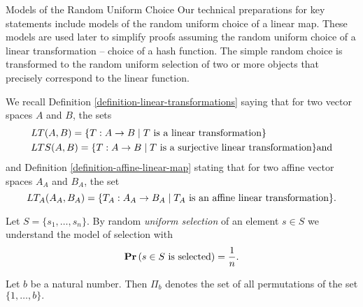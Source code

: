 \begin{section}{Models of the Random Uniform Choice}
Our technical preparations for key statements include models of the random uniform choice of a linear map. These models are used later to simplify proofs assuming the random uniform choice of a linear transformation -- choice of a hash function. The simple random choice is transformed to the random uniform selection of two or more objects that precisely correspond to the linear function.

We recall Definition \ref{definition-linear-transformations} saying that for two vector spaces $A$ and $B$, the sets 
\[
\begin{split}
& LT(A, B) = \{ T: A \rightarrow B \mid T \text{ is a linear transformation} \} \\
& LTS(A, B) = \{ T: A \rightarrow B \mid T \text{ is a surjective linear transformation} \} \text{and}
\end{split}
\]
and Definition \ref{definition-affine-linear-map} stating that for two affine vector spaces $A_A$ and $B_A$, the set
\[
LT_A(A_A, B_A) = \{ T_A: A_A \rightarrow B_A \mid T_A \text{ is an affine linear transformation} \} \text{.}
\]

\begin{definition}
Let $S = \{ s_1, \dots, s_n \}$. By random \emph{uniform selection} of an element $s \in S$ we understand the model of selection with
\[
	\mathbf{Pr}\left(s \in S \text{ is selected}\right) = \frac{1}{n} \text{.}
\]
\end{definition}

\begin{definition}
Let $b$ be a natural number. Then $\Pi_b$ denotes the set of all permutations of the set $\{1, \dots, b\}.$
\end{definition}


\end{section}
